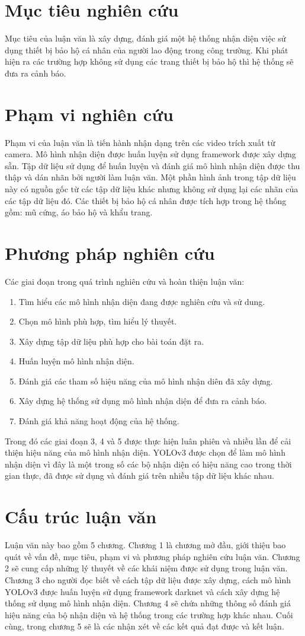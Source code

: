 \section{Mục tiêu nghiên cứu}
Mục tiêu của luận văn là xây dựng, đánh giá một hệ thống nhận diện việc sử dụng thiết bị bảo hộ cá nhân của người lao động trong công trường. Khi phát hiện ra các trường hợp không sử dụng các trang thiết bị bảo hộ thì hệ thống sẽ đưa ra cảnh báo.  

\section{Phạm vi nghiên cứu}
Phạm vi của luận văn là tiến hành nhận dạng trên các video trích xuất từ camera. Mô hình nhận diện được huấn luyện sử dụng framework được xây dựng sẵn. Tập dữ liệu sử dụng để huấn luyện và đánh giá mô hình nhận diện được thu thập và dán nhãn bởi người làm luận văn. Một phần hình ảnh trong tập dữ liệu này có nguồn gốc từ các tập dữ liệu khác nhưng không sử dụng lại các nhãn của các tập dữ liệu đó. Các thiết bị bảo hộ cá nhân được tích hợp trong hệ thống gồm: mũ cứng, áo bảo hộ và khẩu trang.

\section{Phương pháp nghiên cứu}
Các giai đoạn trong quá trình nghiên cứu và hoàn thiện luận văn:
\begin{enumerate}
	\item Tìm hiểu các mô hình nhận diện đang được nghiên cứu và sử dung.
	\item Chọn mô hình phù hợp, tìm hiểu lý thuyết.
	\item Xây dựng tập dữ liệu phù hợp cho bài toán đặt ra.
	\item Huấn luyện mô hình nhận diện.
	\item Đánh giá các tham số hiệu năng của mô hình nhận diên đã xây dựng.
	\item Xây dựng hệ thống sử dụng mô hình nhận diện để đưa ra cảnh báo.
	\item Đánh giá khả năng hoạt động của hệ thống.
\end{enumerate}
Trong đó các giai đoạn 3, 4 và 5 được thực hiện luân phiên và nhiều lần để cải thiện hiệu năng của mô hình nhận diện. YOLOv3 được chọn để làm mô hình nhận diện vì đây là một trong số các bộ nhận diện có hiệu năng cao trong thời gian thực, đã được sử dụng và đánh giá trên nhiều tập dữ liệu khác nhau.

\section{Cấu trúc luận văn}
Luận văn này bao gồm 5 chương. Chương 1 là chương mở đầu, giới thiệu bao quát về vấn đề, mục tiêu, phạm vi và phương pháp nghiên cứu luận văn. Chương 2 sẽ cung cấp những lý thuyết về các khái niệm được sử dụng trong luận văn. Chương 3 cho người đọc biết về cách tập dữ liệu được xây dựng, cách mô hình YOLOv3 được huấn luyện sử dụng framework darknet và cách xây dựng hệ thống sử dụng mô hình nhận diện. Chương 4 sẽ chứa những thông số đánh giá hiệu năng của bộ nhận diện và hệ thống trong các trường hợp khác nhau. Cuối cùng, trong chương 5 sẽ là các nhận xét về các kết quả đạt được và kết luận.